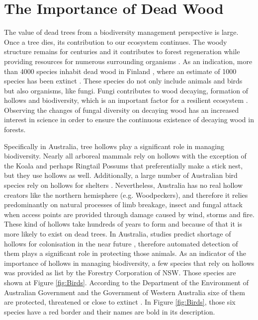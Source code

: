 \documentclass{subfiles}
\begin{document}
\section{The Importance of Dead Wood}

\par The value of dead trees from a biodiversity management perspective is large. Once a tree dies, its contribution to our ecosystem continues. The woody structure remains for centuries and it contributes to forest regeneration while providing resources for numerous surrounding organisms \cite{Franklin1987}. As an indication, more than 4000 species inhabit dead wood in Finland \cite{Siitonen2001}, where an estimate of 1000 species has been extinct \cite{Hanski2000}. These species do not only include animals and birds but also organisms, like fungi. Fungi contributes to wood decaying, formation of hollows and biodiversity, which is an important factor for a resilient ecosystem \cite{Peterson2000}. Observing the changes of fungal diversity on decaying wood has an increased interest in science  \cite{Abrego2011} \cite{Stokland2011} \cite{Lonsdale2008} in order to ensure the continuous existence of decaying wood in forests. 




\par Specifically in Australia, tree hollows play a significant role in managing biodiversity. Nearly all arboreal mammals rely on hollows with the exception of the Koala and perhaps Ringtail Possums that preferentially make a stick nest, but they use hollows as well. Additionally, a large number of Australian bird species rely on hollows for shelters \cite{Gibbons2002}. Nevertheless, Australia has no real hollow creators like the northern hemisphere (e.g. Woodpeckers), and therefore it relies predominantly on natural processes of limb breakage, insect and fungal attack when access points are provided through damage caused by wind, storms and fire. These kind of hollows take hundreds of years to form and because of that it is more likely to exist on dead trees. In Australia, studies predict shortage of hollows for colonisation in the near future \cite{Lindenmayer2010} \cite{Goldingay2009}, therefore automated detection of them plays a significant role in protecting those animals. As an indicator of the importance of hollows in managing biodiversity, a few species that rely on hollows was provided as list by the Forestry Corporation of NSW. Those species are shown at Figure \ref{fig:Birds}. According to the Department of the Environment of Australian Government and the Government of Western Australia sixe of them are  protected, threatened or close to extinct \cite{AustraliaExtinct1999}  \cite{AustraliaExtince2015}. In Figure \ref{fig:Birds}, those six species have a red border and their names are bold in its description. 
\end{document}
